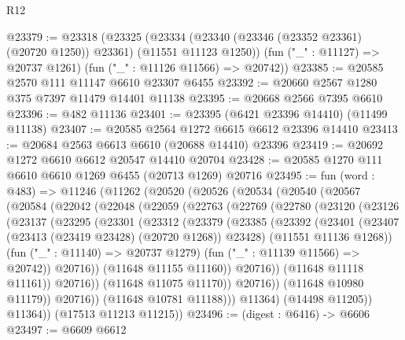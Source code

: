 \begin{lexlean}{R12}
\begin{coremodule}
{{{{{{{{{{{{{{{{{{{{{{{{{{{{{{{{{{{{{{{{{{{{{{{{{{{{{{{{{{{{{{{{{{{{{{{{{{{{{{{{{{@23379 := @23318
    (@23325
      (@23334 (@23340 (@23346 (@23352 @23361) (@20720 @1250)) @23361) (@11551 @11123 @1250))
      (fun ("_" : @11127) => @20737 @1261)
      (fun ("_" : @11126 @11566) => @20742))
@23385 := @20585 @2570 @111 @11147 @6610 @23307 @6455
@23392 := @20660 @2567 @1280 @375 @7397 @11479 @14401 @11138
@23395 := @20668 @2566 @7395 @6610
@23396 := @482 @11136
@23401 := @23395 (@6421 @23396 @14410) (@11499 @11138)
@23407 := @20585 @2564 @1272 @6615 @6612 @23396 @14410
@23413 := @20684 @2563 @6613 @6610 (@20688 @14410) @23396
@23419 := @20692 @1272 @6610 @6612 @20547 @14410 @20704
@23428 := @20585 @1270 @111 @6610 @6610 @1269 @6455 (@20713 @1269) @20716
@23495 := fun (word : @483) =>
  @11246
    (@11262
      (@20520
        (@20526
          (@20534
            (@20540
              (@20567
                (@20584
                  (@22042
                    (@22048
                      (@22059
                        (@22763
                          (@22769
                            (@22780
                              (@23120
                                (@23126
                                  (@23137
                                    (@23295
                                      (@23301
                                        (@23312
                                          (@23379
                                            (@23385
                                              (@23392
                                                (@23401
                                                  (@23407
                                                    (@23413 (@23419 @23428) (@20720 @1268))
                                                    @23428)
                                                  (@11551 @11136 @1268))
                                                (fun ("_" : @11140) => @20737 @1279)
                                                (fun ("_" : @11139 @11566) => @20742))
                                              @20716))
                                          (@11648 @11155 @11160))
                                        @20716))
                                    (@11648 @11118 @11161))
                                  @20716))
                              (@11648 @11075 @11170))
                            @20716))
                        (@11648 @10980 @11179))
                      @20716))
                  (@11648 @10781 @11188)))
              @11364)
            (@14498 @11205))
          @11364))
      (@17513 @11213 @11215))
@23496 := (digest : @6416) -> @6606
@23497 := @6609 @6612
}}}}}}}}}}}}}}}}}}}}}}}}}}}}}}}}}}}}}}}}}}}}}}}}}}}}}}}}}}}}}}}}}}}}}}}}}}}}}}}}}}
\end{coremodule}
\end{lexlean}
